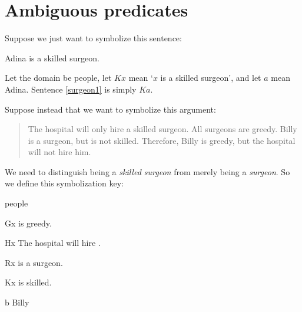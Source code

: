 %
%
%
%


\section{Ambiguous predicates}

Suppose we just want to symbolize this sentence:
\begin{earg}
\item[\ex{surgeon1}] Adina is a skilled surgeon.
\end{earg}
Let the domain be people, let $Kx$ mean `$x$ is a skilled surgeon', and let $a$ mean Adina. Sentence \ref{surgeon1} is simply $Ka$.


Suppose instead that we want to symbolize this argument:
\begin{quote}
The hospital will only hire a skilled surgeon. All surgeons are greedy. Billy is a surgeon, but is not skilled. Therefore, Billy is greedy, but the hospital will not hire him.
\end{quote}
We need to distinguish being a \emph{skilled surgeon} from merely being a \emph{surgeon}. So we define this symbolization key:
\begin{ekey}
\item[\text{domain}] people
\item[Gx]  is greedy.
\item[Hx] The hospital will hire .
\item[Rx]  is a surgeon.
\item[Kx]  is skilled.
\item[b] Billy
\end{ekey}

